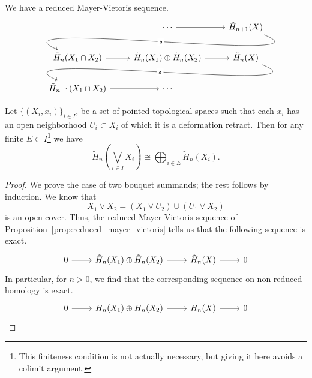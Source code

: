 \documentclass[main.tex]{subfiles}
\begin{document}
\begin{proposition}
  \label{prop:reduced_mayer_vietoris}
  We have a reduced Mayer-Vietoris sequence.
  \begin{equation*}
    \begin{tikzcd}
      & \cdots
      \arrow[r]
      & \tilde{H}_{n+1}(X)
      \\
      \tilde{H}_{n}(X_{1} \cap X_{2})
      \arrow[from=urr, out=-22, in=157, looseness=1, overlay, "\delta" description]
      \arrow[r]
      & \tilde{H}_{n}(X_{1}) \oplus \tilde{H}_{n}(X_{2})
      \arrow[r]
      & \tilde{H}_{n}(X)
      \\
      \tilde{H}_{n-1}(X_{1} \cap X_{2})
      \arrow[r]
      \arrow[from=urr, out=-22, in=157, looseness=1, overlay, "\delta" description]
      & \cdots
    \end{tikzcd}
  \end{equation*}
\end{proposition}

\begin{proposition}
  Let $\{(X_{i}, x_{i})\}_{i \in I}$, be a set of pointed topological spaces such that each $x_{i}$ has an open neighborhood $U_{i} \subset X_{i}$ of which it is a deformation retract. Then for any finite $E \subset I$\footnote{This finiteness condition is not actually necessary, but giving it here avoids a colimit argument.} we have
  \begin{equation*}
    \tilde{H}_{n}\left(\bigvee_{i \in I} X_{i}\right) \cong \bigoplus_{i \in E} \tilde{H}_{n}(X_{i}).
  \end{equation*}
\end{proposition}
\begin{proof}
  We prove the case of two bouquet summands; the rest follows by induction. We know that
  \begin{equation*}
    X_{1} \vee X_{2} = (X_{1} \vee U_{2}) \cup (U_{1} \vee X_{2})
  \end{equation*}
  is an open cover. Thus, the reduced Mayer-Vietoris sequence of \hyperref[prop:reduced_mayer_vietoris]{Proposition~\ref*{prop:reduced_mayer_vietoris}} tells us that the following sequence is exact.
  \begin{equation*}
    \begin{tikzcd}
      0
      \arrow[r]
      & \tilde{H}_{n}(X_{1}) \oplus \tilde{H}_{n}(X_{2})
      \arrow[r]
      & \tilde{H}_{n}(X)
      \arrow[r]
      & 0
    \end{tikzcd}
  \end{equation*}
  In particular, for $n > 0$, we find that the corresponding sequence on non-reduced homology is exact.
  \begin{equation*}
    \begin{tikzcd}
      0
      \arrow[r]
      & H_{n}(X_{1}) \oplus H_{n}(X_{2})
      \arrow[r]
      & H_{n}(X)
      \arrow[r]
      & 0
    \end{tikzcd}
  \end{equation*}
\end{proof}
\end{document}
